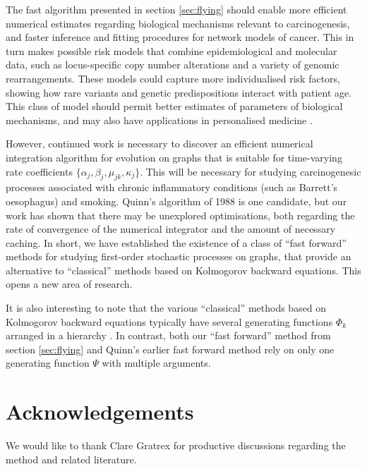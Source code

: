 \documentclass{article}
\begin{document}
The fast algorithm presented in section \ref{sec:flying} should enable more efficient numerical
estimates regarding biological mechanisms relevant to carcinogenesis, and faster
inference and fitting procedures for network models of cancer. This in turn
makes possible risk models that combine epidemiological and molecular data, such as locus-specific copy number
alterations and a variety of genomic rearrangements. These models could
capture more individualised risk factors, showing how rare variants and genetic predispositions interact
with patient age. 
This class of model should permit better estimates of
parameters of biological mechanisms, and may also have applications in
personalised medicine \cite{patersonbozic2020colorectal}.


However, continued work is necessary to discover an efficient numerical integration algorithm for
evolution on graphs that is suitable for time-varying rate coefficients $\{\alpha_j,
\beta_j, \mu_{jk}, \kappa_j\}$. This will be necessary for studying
carcinogenesic processes associated with chronic inflammatory conditions (such as
Barrett's oesophagus) and smoking. Quinn's algorithm of 1988 is one candidate, but our work has
shown that there may be unexplored optimisations, both regarding the rate of
convergence of the numerical integrator and the amount of necessary caching. In
short, we have established the existence of a class of ``fast forward'' methods
for studying first-order stochastic processes on graphs,
that provide an alternative to ``classical'' methods based on Kolmogorov
backward equations. This opens a new area of research.

It is also interesting to note that the various ``classical'' methods based on
Kolmogorov backward equations typically have several generating functions $\Phi_k$
arranged in a hierarchy \cite{luebeck2013impact,zhang2022waiting,donotcite}. 
In contrast, both our ``fast forward'' method from section \ref{sec:flying} and
Quinn's earlier fast forward method rely on only one generating function $\Psi$ with multiple arguments. 


\section{Acknowledgements}

We would like to thank Clare Gratrex for productive discussions regarding the
method and related literature. %
\end{document}

